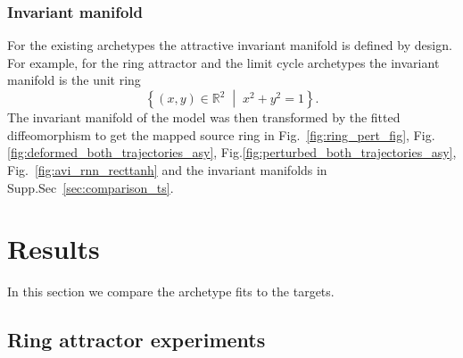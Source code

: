 \documentclass{article}
\theoremstyle{definition} \newtheorem{definition}{Definition}  \newtheorem{example}{Example}
\theoremstyle{remark} \newtheorem{remark}{Remark}
\newcounter{ct}
\begin{document}
\subsubsection{Invariant manifold}\label{sec:inv_man}
For the existing archetypes the attractive invariant manifold is defined by design.
For example, for the ring attractor and the limit cycle archetypes the invariant manifold is the unit ring 
\[
\left\{ (x, y) \in \mathbb{R}^2 \;\middle|\; x^2 + y^2 = 1 \right\}.
\]
The invariant manifold of the model was then transformed by the fitted diffeomorphism to get the mapped source ring in Fig.~\ref{fig:ring_pert_fig}, Fig.~    \ref{fig:deformed_both_trajectories_asy}, Fig.\ref{fig:perturbed_both_trajectories_asy}, Fig.~\ref{fig:avi_rnn_recttanh} and the invariant manifolds in Supp.Sec~\ref{sec:comparison_ts}.


%




\newpage
\section{Results}
In this section we compare the archetype fits to the targets.
\subsection{Ring attractor experiments}
\end{document}
